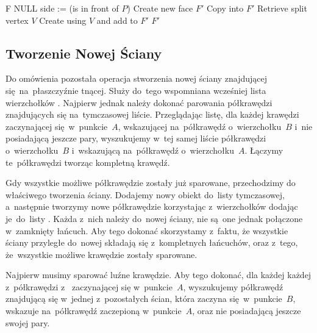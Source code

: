 \documentclass[skorowidz,autorrok,backref,xodstep,oswiadczenie]{wmimgr}
\begin{document}
\begin{algorithm}
\caption{$CutFace(F, P)$}
\label{CutFace}
\begin{algorithmic}
        \RETURN F
    \ENDIF
        \RETURN NULL
    \ENDIF
    \STATE {}
    \STATE side := (is  in front of $P$)
    \STATE Create new face $F'$
    \REPEAT
            \STATE Copy  into $F'$
        \ENDIF
            \STATE Retrieve split vertex $V$
            \STATE Create  using $V$ and add to $F'$
            \STATE {}
        \ENDIF
        \STATE {}
    \RETURN $F'$
\end{algorithmic}
\end{algorithm}

\subsection{Tworzenie Nowej Ściany}

Do omówienia pozostała operacja stworzenia nowej ściany znajdującej się~na~płaszczyźnie tnącej. Służy do~tego wspomniana wcześniej lista wierzchołków . Najpierw jednak należy dokonać parowania półkrawędzi znajdujących się na~tymczasowej liście. Przeglądając listę, dla każdej krawędzi zaczynającej się~w~punkcie~$A$, wskazującej na~półkrawędź o~wierzchołku~$B$ i~nie posiadającą jeszcze pary, wyszukujemy w~tej samej liście półkrawędzi o~wierzchołku~$B$ i~wskazującą na~półkrawędź o~wierzchołku~$A$. Łączymy te~półkrawędzi tworząc kompletną krawędź.

Gdy wszystkie możliwe półkrawędzie zostały już sparowane, przechodzimy do właściwego tworzenia ściany. Dodajemy nowy obiekt  do~listy tymczasowej, a~następnie tworzymy nowe półkrawędzie korzystając z~wierzchołków  dodając je~do~listy . Każda z~nich należy do~nowej ściany, nie są~one jednak połączone w~zamknięty łańcuch. Aby tego dokonać skorzystamy z~faktu, że wszystkie ściany przyległe do~nowej składają się z~kompletnych łańcuchów, oraz z~tego, że~wszystkie możliwe krawędzie zostały sparowane.

Najpierw musimy sparować luźne krawędzie. Aby tego dokonać, dla każdej każdej z~półkrawędzi z~ zaczynającej się w~punkcie~$A$, wyszukujemy półkrawędź znajdującą się w~jednej z~pozostałych ścian, która zaczyna się~w~punkcie~$B$, wskazuje na~półkrawędź zaczepioną w~punkcie~$A$, oraz nie posiadającą jeszcze swojej pary.
\end{document}
